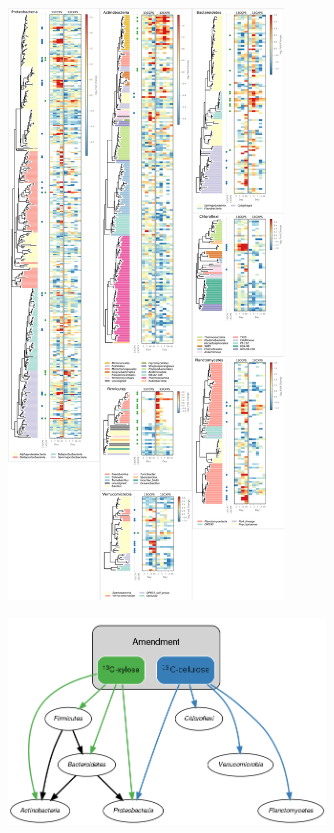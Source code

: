 \begin{figure}[H]
	\begin{center}
    \centerline{\includegraphics[width=0.65\textwidth]{figures/tiled_tree/tiled_tree.png}}
    \caption{\protect}\label{fig:tiledtree}
    \end{center} 
\end{figure}

\begin{figure}[H]
	\begin{center}
    \centerline{\includegraphics[width=0.75\textwidth]{figures/foodweb/foodweb.png}}
    \caption{\protect}\label{fig:foodweb}
    \end{center} 
\end{figure}



